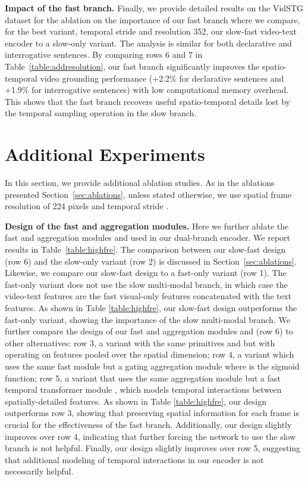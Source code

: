 \noindent \textbf{Impact of the fast branch.} 
Finally, we provide detailed results on the VidSTG dataset for the ablation on the importance of our fast branch where we compare, for the best variant, temporal stride  and resolution 352, our slow-fast video-text encoder to a slow-only variant.
The analysis is similar for both declarative and interrogative sentences.
By comparing rows 6 and 7 in Table~\ref{table:addresolution}, our fast branch significantly improves the spatio-temporal video grounding performance (+2.2\%  for declarative sentences and +1.9\%  for interrogative sentences) with low computational memory overhead.
This shows that the fast branch recovers useful spatio-temporal details lost by the temporal sampling operation in the slow branch.

\section{Additional Experiments}\label{sec:addexp}
In this section, we provide additional ablation studies. As in the ablations presented Section~\ref{sec:ablations}, unless stated otherwise, we use spatial frame resolution of 224 pixels and temporal stride .

\noindent \textbf{Design of the fast and aggregation modules.}\label{sec:design}
Here we further ablate the fast and aggregation modules  and  used in our dual-branch encoder.
We report results in Table~\ref{table:highfre}.
The comparison between our slow-fast design (row 6) and the slow-only variant (row 2) is discussed in Section~\ref{sec:ablations}.
Likewise, we compare our slow-fast design to a fast-only variant (row 1). The fast-only variant does not use the slow multi-modal branch, in which case the video-text features are the fast visual-only features concatenated with the text features.
As shown in Table \ref{table:highfre}, our slow-fast design outperforms the fast-only variant, showing the importance of the slow multi-modal branch. 
We further compare the design of our fast and aggregation modules  and  (row 6) to other alternatives:
row 3, a variant with the same primitives  and  but with  operating on features pooled over the spatial dimension;
row 4, a variant which uses the same fast module  but a gating aggregation module  where  is the sigmoid function;
row 5, a variant that uses the same aggregation module  but a fast temporal transformer module , which models temporal interactions between spatially-detailed features.
As shown in Table \ref{table:highfre}, our design outperforms row 3, showing that preserving spatial information for each frame is crucial for the effectiveness of the fast branch. 
Additionally, our design slightly improves over row 4, indicating that further forcing the network to use the slow branch is not helpful.
Finally, our design slightly improves over row 5, suggesting that additional modeling of temporal interactions in our encoder is not necessarily helpful.